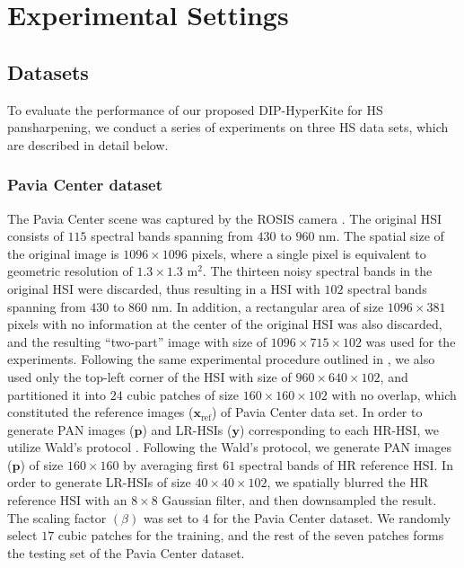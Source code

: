 \documentclass[journal]{IEEEtran}
\begin{document}
\section{Experimental Settings}
\label{sec: experimental_settings}
    \subsection{Datasets}
        \label{sec:datasets}
        To evaluate the performance of our proposed DIP-HyperKite for HS pansharpening, we conduct a series of experiments on three HS data sets, which are described in detail below.
        
        \subsubsection{Pavia Center dataset} The Pavia Center scene was captured by the ROSIS camera \cite{ROSIS_camera}. The original HSI consists of $115$ spectral bands spanning from $430$ to $960$ nm. The spatial size of the original image is $1096 \times 1096$ pixels, where a single pixel is equivalent to geometric resolution of $1.3\times1.3$ m$^2$. The thirteen noisy spectral bands in the original HSI were discarded, thus resulting in a HSI with $102$ spectral bands spanning from $430$ to $860$ nm. In addition, a rectangular area of size $1096 \times 381$ pixels with no information at the center of the original HSI was also discarded, and the resulting ``two-part'' image with size of $1096 \times 715 \times 102$ was used for the experiments. Following the same experimental procedure outlined in \cite{DHP-DARN}, we also used only the top-left corner of the HSI with size of $960 \times 640 \times 102$, and partitioned it into $24$ cubic patches of size $160 \times 160 \times 102$ with no overlap, which constituted the reference images ($\mathbf{x}_{\text{ref}}$) of  Pavia Center data set. In order to generate PAN images ($\mathbf{p}$) and LR-HSIs ($\mathbf{y}$) corresponding to each HR-HSI, we utilize Wald's protocol \cite{walds_protocol}. Following the Wald's protocol, we generate PAN images ($\mathbf{p}$) of size $160 \times 160$ by averaging first $61$ spectral bands of HR reference HSI. In order to generate LR-HSIs of size $40 \times 40 \times 102$, we spatially blurred the HR reference HSI with an $8 \times 8$ Gaussian filter, and then downsampled the result. The scaling factor $(\beta)$ was set to $4$ for the Pavia Center dataset. We randomly select $17$ cubic patches for the training, and the rest of the seven patches forms the testing set of the Pavia Center dataset.
        
\end{document}
